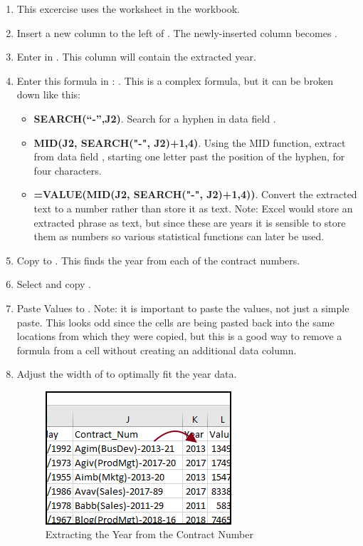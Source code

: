 \begin{enumerate}
	\item This excercise uses the  worksheet in the  workbook.
	\item Insert a new column to the left of . The newly-inserted column becomes .
	\item Enter  in . This column will contain the extracted year.
	\item Enter this formula in : . This is a complex formula, but it can be broken down like this: 
	
	\begin{itemize}
		\item \textbf{SEARCH(``-'',J2)}. Search for a hyphen in data field .
		\item \textbf{MID(J2, SEARCH("-", J2)+1,4)}. Using the MID function, extract from data field , starting one letter past the position of the hyphen, for four characters.
		\item \textbf{=VALUE(MID(J2, SEARCH("-", J2)+1,4))}. Convert the extracted text to a number rather than store it as text. Note: Excel would store an extracted phrase as text, but since these are years it is sensible to store them as numbers so various statistical functions can later be used.
	\end{itemize}

	\item Copy  to . This finds the year from each of the contract numbers.
	\item Select and copy .
	\item Paste Values to . Note: it is important to paste the values, not just a simple paste. This looks odd since the cells are being pasted back into the same locations from which they were copied, but this is a good way to remove a formula from a cell without creating an additional data column.
	\item Adjust the width of  to optimally fit the year data.
	
	\begin{figure}[H]
		\centering
		\includegraphics[width=\maxwidth{.95\linewidth}]{gfx/ch09_fig35}
		\caption{Extracting the Year from the Contract Number}
		\label{09:fig35}
	\end{figure}
	
\end{enumerate}

